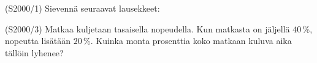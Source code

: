 \begin{tehtava}(S2000/1) Sievennä seuraavat lausekkeet:
\end{tehtava}

\begin{tehtava}(S2000/3) Matkaa kuljetaan tasaisella nopeudella. Kun matkasta on jäljellä $40$\,\%, nopeutta lisätään $20$\,\%. Kuinka monta prosenttia koko matkaan kuluva aika tällöin lyhenee?
\end{tehtava}


